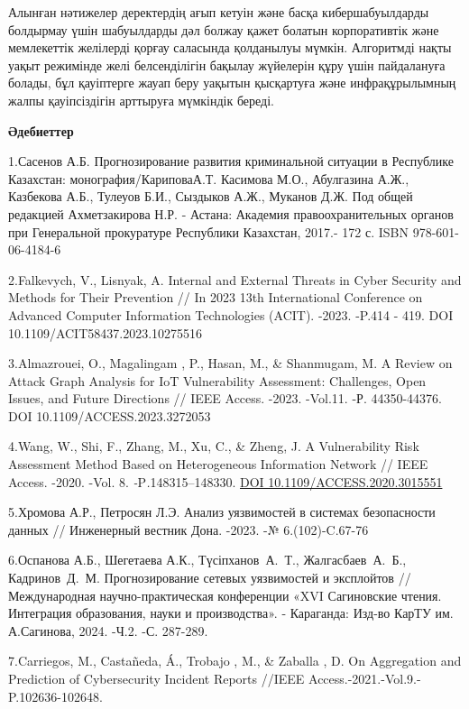 \documentclass[
]{article}
\begin{document}
Алынған нәтижелер деректердің ағып кетуін және басқа кибершабуылдарды
болдырмау үшін шабуылдарды дәл болжау қажет болатын корпоративтік және
мемлекеттік желілерді қорғау саласында қолданылуы мүмкін. Алгоритмді
нақты уақыт режимінде желі белсенділігін бақылау жүйелерін құру үшін
пайдалануға болады, бұл қауіптерге жауап беру уақытын қысқартуға және
инфрақұрылымның жалпы қауіпсіздігін арттыруға мүмкіндік береді.

\textbf{Әдебиеттер}

1.Сасенов А.Б. Прогнозирование развития криминальной ситуации в
Республике Казахстан: монография/КариповаА.Т. Касимова М.О., Абулгазина
А.Ж., Казбекова А.Б., Тулеуов Б.И., Сыздыков А.Ж., Муканов Д.Ж. Под
общей редакцией Ахметзакирова Н.Р. - Астана: Академия правоохранительных
органов при Генеральной прокуратуре Республики Казахстан, 2017.- 172 с.
ISBN 978-601-06-4184-6

2.Falkevych, V., Lisnyak, A. Internal and External Threats in Cyber
Security and Methods for Their Prevention // In 2023 13th International
Conference on Advanced Computer Information Technologies (ACIT). -2023.
-P.414 - 419. DOI 10.1109/ACIT58437.2023.10275516

3.Almazrouei, O., Magalingam , P., Hasan, M., \& Shanmugam, M. A Review
on Attack Graph Analysis for IoT Vulnerability Assessment: Challenges,
Open Issues, and Future Directions // IEEE Access. -2023. -Vol.11. -Р.
44350-44376. DOI 10.1109/ACCESS.2023.3272053

4.Wang, W., Shi, F., Zhang, M., Xu, C., \& Zheng, J. A Vulnerability
Risk Assessment Method Based on Heterogeneous Information Network //
IEEE Access. -2020. -Vol. 8. \emph{-}P\emph{.}148315--148330.
\href{https://doi.org/10.1109/ACCESS.2020.3015551}{DOI
10.1109/ACCESS.2020.3015551}

5.Хромова А.Р., Петросян Л.Э. Анализ уязвимостей в системах безопасности
данных // Инженерный вестник Дона. -2023. -№ 6.(102)-C.67-76

6.Оспанова А.Б., Шегетаева А.К., Түсіпханов~А.~Т., Жалгасбаев~А.~Б.,
Кадринов~Д.~М. Прогнозирование сетевых уязвимостей и эксплойтов //
Международная научно-практическая конференции «XVI Сагиновские чтения.
Интеграция образования, науки и производства». - Караганда: Изд-во КарТУ
им. А.Сагинова, 2024. -Ч.2. -С. 287-289.

7.Carriegos, M., Castañeda, Á., Trobajo , M., \& Zaballa , D. On
Aggregation and Prediction of Cybersecurity Incident Reports //IEEE
Access.-2021.-Vol.9.-P.102636-102648.
\end{document}
